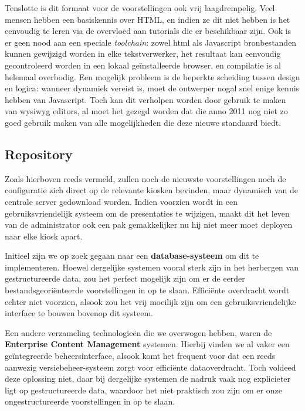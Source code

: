 Tenslotte is dit formaat voor de voorstellingen ook vrij laagdrempelig. Veel mensen hebben een basiskennis over HTML, en indien ze dit niet hebben is het eenvoudig te leren via de overvloed aan tutorials die er beschikbaar zijn. Ook is er geen nood aan een speciale \emph{toolchain}: zowel \ac{html} als Javascript bronbestanden kunnen gewijzigd worden in elke tekstverwerker, het resultaat kan eenvoudig gecontroleerd worden in een lokaal geïnstalleerde browser, en compilatie is al helemaal overbodig.
Een mogelijk probleem is de beperkte scheiding tussen design en logica: wanneer dynamiek vereist is, moet de ontwerper nogal snel enige kennis hebben van Javascript. Toch kan dit verholpen worden door gebruik te maken van \ac{wysiwyg} editors, al moet het gezegd worden dat die anno 2011 nog niet zo goed gebruik maken van alle mogelijkheden die deze nieuwe standaard biedt.

\subsection{Repository}

Zoals hierboven reeds vermeld, zullen noch de nieuwste voorstellingen noch de configuratie zich direct op de relevante kiosken bevinden, maar dynamisch van de centrale server gedownload worden. Indien voorzien wordt in een gebruiksvriendelijk systeem om de presentaties te wijzigen, maakt dit het leven van de administrator ook een pak gemakkelijker nu hij niet meer moet deployen naar elke kiosk apart.

Initieel zijn we op zoek gegaan naar een \textbf{database-systeem} om dit te implementeren. Hoewel dergelijke systemen vooral sterk zijn in het herbergen van gestructureerde data, zou het perfect mogelijk zijn om er de eerder bestandsgeoriënteerde voorstellingen in op te slaan. Efficiënte overdracht wordt echter niet voorzien, alsook zou het vrij moeilijk zijn om een gebruiksvriendelijke interface te bouwen bovenop dit systeem.

Een andere verzameling technologieën die we overwogen hebben, waren de \textbf{Enterprise Content Management} systemen. Hierbij vinden we al vaker een geïntegreerde beheersinterface, alsook komt het frequent voor dat een reeds aanwezig versiebeheer-systeem zorgt voor efficiënte dataoverdracht. Toch voldeed deze oplossing niet, daar bij dergelijke systemen de nadruk vaak nog explicieter ligt op gestructureerde data, waardoor het niet praktisch zou zijn om er onze ongestructureerde voorstellingen in op te slaan.

